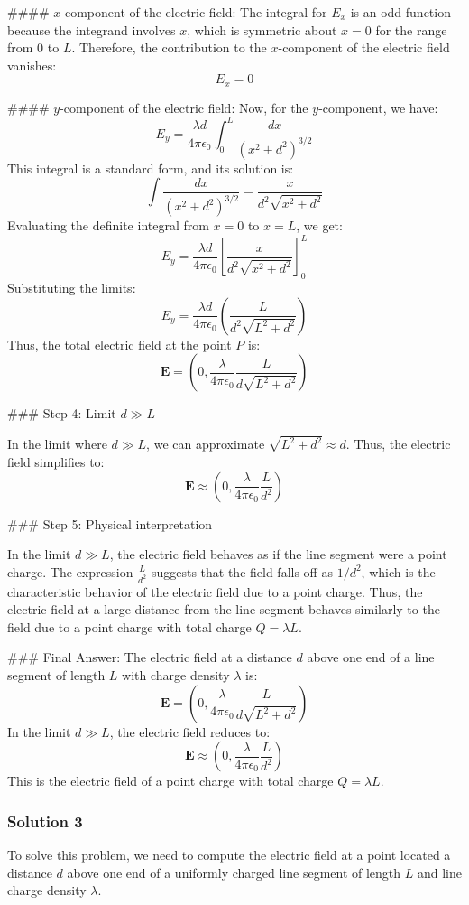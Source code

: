 \documentclass{article}
\begin{document}
#### \( x \)-component of the electric field:
The integral for \( E_x \) is an odd function because the integrand involves \( x \), which is symmetric about \( x = 0 \) for the range from \( 0 \) to \( L \). Therefore, the contribution to the \( x \)-component of the electric field vanishes:
\[
E_x = 0
\]

#### \( y \)-component of the electric field:
Now, for the \( y \)-component, we have:
\[
E_y = \frac{\lambda d}{4\pi \epsilon_0} \int_0^L \frac{dx}{(x^2 + d^2)^{3/2}}
\]
This integral is a standard form, and its solution is:
\[
\int \frac{dx}{(x^2 + d^2)^{3/2}} = \frac{x}{d^2 \sqrt{x^2 + d^2}}
\]
Evaluating the definite integral from \( x = 0 \) to \( x = L \), we get:
\[
E_y = \frac{\lambda d}{4\pi \epsilon_0} \left[ \frac{x}{d^2 \sqrt{x^2 + d^2}} \right]_0^L
\]
Substituting the limits:
\[
E_y = \frac{\lambda d}{4\pi \epsilon_0} \left( \frac{L}{d^2 \sqrt{L^2 + d^2}} \right)
\]
Thus, the total electric field at the point \( P \) is:
\[
\mathbf{E} = \left( 0, \frac{\lambda}{4\pi \epsilon_0} \frac{L}{d \sqrt{L^2 + d^2}} \right)
\]

### Step 4: Limit \( d \gg L \)

In the limit where \( d \gg L \), we can approximate \( \sqrt{L^2 + d^2} \approx d \). Thus, the electric field simplifies to:
\[
\mathbf{E} \approx \left( 0, \frac{\lambda}{4\pi \epsilon_0} \frac{L}{d^2} \right)
\]

### Step 5: Physical interpretation

In the limit \( d \gg L \), the electric field behaves as if the line segment were a point charge. The expression \( \frac{L}{d^2} \) suggests that the field falls off as \( 1/d^2 \), which is the characteristic behavior of the electric field due to a point charge. Thus, the electric field at a large distance from the line segment behaves similarly to the field due to a point charge with total charge \( Q = \lambda L \).

### Final Answer:
The electric field at a distance \( d \) above one end of a line segment of length \( L \) with charge density \( \lambda \) is:
\[
\mathbf{E} = \left( 0, \frac{\lambda}{4\pi \epsilon_0} \frac{L}{d \sqrt{L^2 + d^2}} \right)
\]
In the limit \( d \gg L \), the electric field reduces to:
\[
\mathbf{E} \approx \left( 0, \frac{\lambda}{4\pi \epsilon_0} \frac{L}{d^2} \right)
\]
This is the electric field of a point charge with total charge \( Q = \lambda L \).

\subsubsection{Solution 3}
To solve this problem, we need to compute the electric field at a point located a distance \( d \) above one end of a uniformly charged line segment of length \( L \) and line charge density \( \lambda \).
\end{document}
